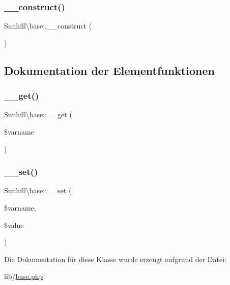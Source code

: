 \subsubsection{\texorpdfstring{\+\_\+\+\_\+construct()}{\_\_construct()}}
{\footnotesize\ttfamily Sunhill\textbackslash{}base\+::\+\_\+\+\_\+construct (\begin{DoxyParamCaption}{ }\end{DoxyParamCaption})}



\subsection{Dokumentation der Elementfunktionen}
\mbox{\label{classSunhill_1_1base_a03423cf6a73a895dac51e5b2f55e3e97}} 
\subsubsection{\texorpdfstring{\+\_\+\+\_\+get()}{\_\_get()}}
{\footnotesize\ttfamily Sunhill\textbackslash{}base\+::\+\_\+\+\_\+get (\begin{DoxyParamCaption}\item[{}]{\$varname }\end{DoxyParamCaption})}

\mbox{\label{classSunhill_1_1base_a0a4c979226b7cefcb7f6687fbd25c1ee}} 
\subsubsection{\texorpdfstring{\+\_\+\+\_\+set()}{\_\_set()}}
{\footnotesize\ttfamily Sunhill\textbackslash{}base\+::\+\_\+\+\_\+set (\begin{DoxyParamCaption}\item[{}]{\$varname,  }\item[{}]{\$value }\end{DoxyParamCaption})}



Die Dokumentation für diese Klasse wurde erzeugt aufgrund der Datei\+:\begin{DoxyCompactItemize}
\item 
lib/\hyperlink{base_8php}{base.\+php}\end{DoxyCompactItemize}
